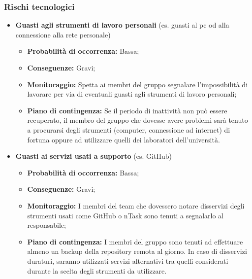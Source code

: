 	\subsubsection{Rischi tecnologici}
		\begin{itemize}
			\item \textbf{Guasti agli strumenti di lavoro personali} (es. guasti al pc od alla connessione alla rete personale)
				\begin{itemize}
					\item \textbf{Probabilità di occorrenza:} Bassa;
					\item \textbf{Conseguenze:} Gravi;
					\item \textbf{Monitoraggio:} Spetta ai membri del gruppo segnalare l'impossibilità di lavorare per via di eventuali guasti agli strumenti di lavoro personali;
					\item \textbf{Piano di contingenza:} Se il periodo di inattività non può essere recuperato, il membro del gruppo che dovesse avere problemi sarà tenuto a procurarsi degli strumenti (computer, connessione ad internet) di fortuna oppure ad utilizzare quelli dei laboratori dell'università.
				\end{itemize}
			\item \textbf{Guasti ai servizi usati a supporto} (es. GitHub)
				\begin{itemize}
					\item \textbf{Probabilità di occorrenza:} Bassa;
					\item \textbf{Conseguenze:} Gravi;
					\item \textbf{Monitoraggio:} I membri del team che dovessero notare disservizi degli strumenti usati come GitHub o nTask sono tenuti a segnalarlo al responsabile;
					\item \textbf{Piano di contingenza:} I membri del gruppo sono tenuti ad effettuare almeno un backup della repository remota al giorno. In caso di disservizi duraturi, saranno utilizzati servizi alternativi tra quelli considerati	durante la scelta degli strumenti da utilizzare.
				\end{itemize}
		\end{itemize}
